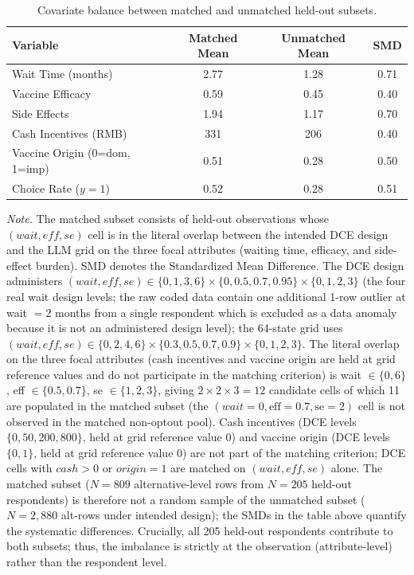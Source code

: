 \documentclass[11pt]{article}
\begin{document}
\begin{table}[h]
\centering
\caption{Covariate balance between matched and unmatched held-out subsets.}
\label{tab:S15}
\small
\begin{tabular}{l c c c}
\toprule
\textbf{Variable} & \textbf{Matched Mean} & \textbf{Unmatched Mean} & \textbf{SMD} \\
\midrule
Wait Time (months) & 2.77 & 1.28 & 0.71 \\
Vaccine Efficacy & 0.59 & 0.45 & 0.40 \\
Side Effects & 1.94 & 1.17 & 0.70 \\
Cash Incentives (RMB) & 331 & 206 & 0.40 \\
Vaccine Origin (0=dom, 1=imp) & 0.51 & 0.28 & 0.50 \\
Choice Rate ($y=1$) & 0.52 & 0.28 & 0.51 \\
\bottomrule
\end{tabular}
\vspace{0.4em}
\begin{minipage}{0.95\textwidth}
\small
\textit{Note.} The matched subset consists of held-out observations whose \emph{$(wait, eff, se)$} cell is in the literal overlap between the intended DCE design and the LLM grid on the three focal attributes (waiting time, efficacy, and side-effect burden). SMD denotes the Standardized Mean Difference. The DCE design administers $(wait, eff, se) \in \{0,1,3,6\} \times \{0,0.5,0.7,0.95\} \times \{0,1,2,3\}$ (the four real wait design levels; the raw coded data contain one additional 1-row outlier at wait $= 2$ months from a single respondent which is excluded as a data anomaly because it is not an administered design level); the 64-state grid uses $(wait, eff, se) \in \{0,2,4,6\} \times \{0.3,0.5,0.7,0.9\} \times \{0,1,2,3\}$. The literal overlap on the three focal attributes (cash incentives and vaccine origin are held at grid reference values and do not participate in the matching criterion) is wait $\in \{0, 6\}$, eff $\in \{0.5, 0.7\}$, se $\in \{1, 2, 3\}$, giving $2 \times 2 \times 3 = 12$ candidate cells of which 11 are populated in the matched subset (the $(wait=0, \text{eff}=0.7, \text{se}=2)$ cell is not observed in the matched non-optout pool). Cash incentives (DCE levels $\{0, 50, 200, 800\}$, held at grid reference value $0$) and vaccine origin (DCE levels $\{0, 1\}$, held at grid reference value $0$) are not part of the matching criterion; DCE cells with $cash > 0$ or $origin = 1$ are matched on $(wait, eff, se)$ alone. The matched subset ($N=809$ alternative-level rows from $N=205$ held-out respondents) is therefore not a random sample of the unmatched subset ($N=2{,}880$ alt-rows under intended design); the SMDs in the table above quantify the systematic differences. Crucially, all 205 held-out respondents contribute to both subsets; thus, the imbalance is strictly at the observation (attribute-level) rather than the respondent level.
\end{minipage}
\end{table}
\end{document}
